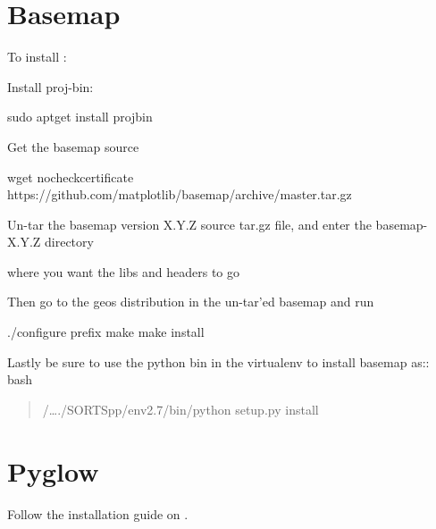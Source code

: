 \documentclass[letterpaper,10pt,english]{sphinxmanual}
\begin{document}
\section{Basemap}
\label{\detokenize{introduction/more_dependencies:basemap}}
To install :

Install proj-bin:

%
\begin{sphinxVerbatim}[commandchars=\\\{\}]
sudo apt\PYGZhy{}get install proj\PYGZhy{}bin
\end{sphinxVerbatim}

Get the basemap source

%
\begin{sphinxVerbatim}[commandchars=\\\{\}]
wget \PYGZhy{}\PYGZhy{}no\PYGZhy{}check\PYGZhy{}certificate https://github.com/matplotlib/basemap/archive/master.tar.gz
\end{sphinxVerbatim}

Un-tar the basemap version X.Y.Z source tar.gz file, and enter the basemap-X.Y.Z directory

%
\begin{sphinxVerbatim}[commandchars=\\\{\}]
 \PYGZlt{}where you want the libs and headers to go\PYGZgt{}
\end{sphinxVerbatim}

Then go to the geos distribution in the un-tar’ed basemap and run

%
\begin{sphinxVerbatim}[commandchars=\\\{\}]
./configure \PYGZhy{}\PYGZhy{}prefix
make make install
\end{sphinxVerbatim}

Lastly be sure to use the python bin in the virtualenv to install basemap as:: bash
\begin{quote}

/…./SORTSpp/env2.7/bin/python setup.py install
\end{quote}


\section{Pyglow}
\label{\detokenize{introduction/more_dependencies:pyglow}}
Follow the installation guide on .
\end{document}
